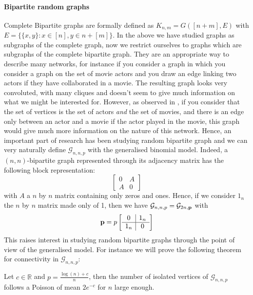 \paragraph{Bipartite random graphs}
Complete Bipartite graphs are formally defined as $K_{n,m} = G([n+m], E)$ with $E=\{\{x,y\} : x\in[n], y\in n+[m]\}$.
In the above we have studied graphs as subgraphs of the complete graph, now we restrict ourselves to graphs which are subgraphs of the complete bipartite graph.
They are an appropriate way to describe many networks, for instance if you consider a graph in which you consider a graph on the set of movie actors and you draw an edge linking two actors if they have collaborated in a movie.
The resulting graph looks very convoluted, with many cliques and doesn't seem to give much information on what we might be interested for.
However, as observed in \cite{Newman01}, if you consider that the set of vertices is the set of actors \emph{and} the set of movies, and there is an edge only between an actor and a movie if the actor played in the movie,
this graph would give much more information on the nature of this network.
\newline
Hence, an important part of research has been studying random bipartite graph and we can very naturally define $\mathcal{G}_{n,n, p}$ with the generalised binomial model.
Indeed, a $(n,n)$-bipartite graph represented through its adjacency matrix has the following block representation:
\begin{equation}
    \left[
\begin{array}{c|c}
        0 & A \\
         \hline
        A & 0
        \end{array}
\right]
\end{equation}
with $A$ a $n$ by $n$ matrix containing only zeros and ones.
Hence, if we consider $1_n$ the $n$ by $n$ matrix made only of 1, then we have $\mathcal{G}_{n,n,p} = \mathcal{G}_{2n,\bold{p}}$ with
\begin{equation}\label{eq:pMat}
    \bold{p} = p\left[
\begin{array}{c|c}
        0 & 1_n \\
         \hline
        1_n & 0
        \end{array}
\right]
\end{equation}
This raises interest in studying random bipartite graphs through the point of view of the generalised model.
For instance we will prove the following theorem for connectivity in $\mathcal{G}_{n,n,p}$:
\begin{theorem}
	Let $c\in \mathbb{R}$ and $p=\frac{\log(n) + c}{n}$, then the number of isolated vertices of $\mathcal{G}_{n,n,p}$  follows a Poisson of mean $2e^{-c}$ for $n$ large enough.
\end{theorem}
